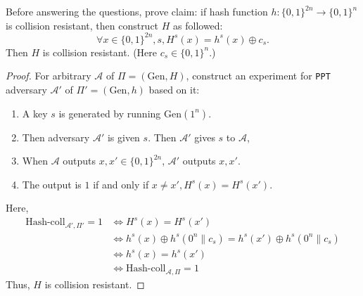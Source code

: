 \documentclass[a4paper]{article}
\newcommand{\Gen}{\text{Gen}}
\newcommand{\hashcoll}{\text{Hash-coll}}
\newcommand{\A}{\mathcal{A}}
\newenvironment{problem}[2][Problem]{\begin{trivlist}
\item[\hskip \labelsep {\bfseries #1}\hskip \labelsep {\bfseries #2.}]}{\end{trivlist}}
\begin{document}
\begin{problem}{5.6}
Before answering the questions, prove claim: if hash function $h:\{0,1\}^{2n}\rightarrow \{0,1\}^{n}$ is collision resistant, then construct $H$ as followed:\[\forall x\in\{0,1\}^{2n},s, H^s(x)=h^s(x)\oplus c_s.\]
Then $H$ is collision resistant. (Here $c_s\in\{0,1\}^n$.)\par
\begin{proof}
For arbitrary $\A$ of $\Pi=(\Gen,H)$, construct an experiment for \texttt{PPT} adversary $\A'$ of $\Pi'=(\Gen,h)$ based on it:\begin{enumerate}
    \item A key $s$ is generated by running $\Gen(1^n)$.
    \item Then adversary $\A'$ is given $s$. Then $\A'$ gives $s$ to $\A$, \item When $\A$ outputs $x,x'\in\{0,1\}^{2n}$, $\A'$ outputs $x,x'$.
    \item The output is $1$ if and only if $x\ne x',H^{s}(x)=H^{s}(x')$.
\end{enumerate}
Here, 
\begin{align*}
    \hashcoll_{\A',\Pi'}=1&\Leftrightarrow H^{s}(x)=H^{s}(x')\\
    &\Leftrightarrow h^{s}(x)\oplus h^{s}(0^n\|c_s)=h^{s}(x')\oplus h^{s}(0^n\|c_s)\\
    &\Leftrightarrow h^{s}(x)=h^{s}(x')\\
    &\Leftrightarrow\hashcoll_{\A,\Pi}=1
\end{align*}
Thus, $H$ is collision resistant.
\end{proof}


\end{problem}
\end{document}
